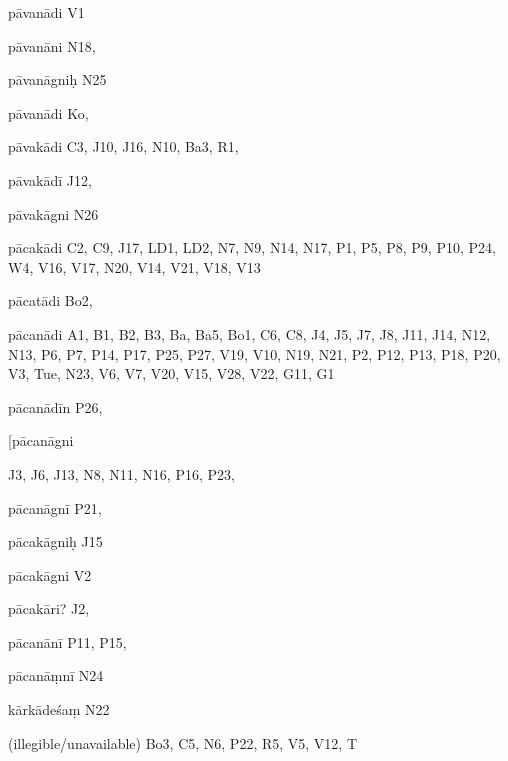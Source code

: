 \begin{ekdosis}
\begin{marma}[hp01_055]
\begin{marma}[hp02_009]
\begin{marma}[hp02_011]
 \begin{marma}[hp02_35a]
\item[pāvanādi] V1
\item[pāvanāni] N18,
\item[pāvanāgniḥ] N25
\item[pāvanādi] Ko,
\item[pāvakādi] C3, J10, J16, N10, Ba3, R1, 
\item[pāvakādī] J12,
\item[pāvakāgni] N26
\item[pācakādi] C2, C9, J17, LD1, LD2, N7, N9, N14, N17, P1, P5, P8, P9, P10, P24, W4, V16, V17, N20, V14, V21, V18, V13
\item[pācatādi] Bo2, 
\item[pācanādi] A1, B1, B2, B3, Ba, Ba5, Bo1, C6, C8, J4, J5, J7, J8, J11, J14, N12, N13, P6, P7, P14, P17, P25, P27, V19, V10, N19, N21, P2, P12, P13, P18, P20, V3, Tue, N23, V6, V7, V20, V15, V28, V22, G11, G1
\item[pācanādīn P26, 
\item[pācanāgni] J3, J6, J13, N8, N11, N16, P16, P23, 
\item[pācanāgnī] P21,
\item[pācakāgniḥ] J15
\item[pācakāgni] V2
\item[pācakāri?] J2,
\item[pācanānī] P11, P15, 
\item[pācanāṃnī] N24
\item[kārkādeśaṃ] N22
\item[(illegible/unavailable)] Bo3, C5, N6, P22, R5, V5, V12, T
  \begin{description}

    \end{description}
 \end{marma}


\end{marma}
\end{marma}
\end{marma}
\end{ekdosis}

